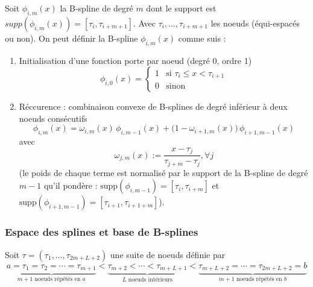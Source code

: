 \documentclass[11pt,a4paper,oneside]{report}
\begin{document}
	
	Soit $\phi_{i,m}(x)$ la B-spline de degré $m$ dont le support est $supp(\phi_{i,m}(x)) = [\tau_i, \tau_{i+m+1}]$. Avec $\tau_i, \ldots, \tau_{i+m+1}$ les noeuds (équi-espacés ou non). On peut définir la B-spline $\phi_{i,m}(x)$ comme suis \cite{deBoor} : 
	\begin{enumerate}
		\item Initialisation d'une fonction porte par noeud (degré 0, ordre 1)
		\begin{equation}
			\phi_{i,0}(x) = \begin{cases}
				1 & \text{si } \tau_i \leq x < \tau_{i+1} \\
				0 & \text{sinon}
			\end{cases}
		\end{equation}
		
		\item Réccurence : combinaison convexe de B-splines de degré inférieur à deux noeuds consécutifs
		\begin{equation}
			\phi_{i, m}(x) = \omega_{i,m}(x)\, \phi_{i, m-1}(x) + \big(1 - \omega_{i+1,m}(x)\big)\, \phi_{i+1, m-1}(x)
		\end{equation}
		avec
		\begin{equation}
			\omega_{j,m}(x) := \frac{x - \tau_j}{\tau_{j+m}- \tau_j}, \forall j
		\end{equation}
		(le poids de chaque terme est normalisé par le support de la B-spline de degré $m-1$ qu'il pondère : $\text{supp}(\phi_{i,m-1}) = [\tau_i, \tau_{i+m}]$ et $\text{supp}(\phi_{i+1,m-1}) = [\tau_{i+1}, \tau_{i+1+m}]$).
	\end{enumerate}
	
	
	\subsubsection{Espace des splines et base de B-splines}
	Soit $\tau = (\tau_1,\ldots,\tau_{2m+L+2})$ une suite de noeuds définie par
	\begin{equation} \underbrace{a = \tau_1 = \tau_2 = \cdots = \tau_{m+1}}_{m+1 \text{ noeuds répétés en } a} < \underbrace{\tau_{m+2} < \cdots < \tau_{m+L+1}}_{L \text{ noeuds intérieurs}} < \underbrace{\tau_{m+L+2} = \cdots = \tau_{2m+L+2}=b}_{m+1 \text{ noeuds répétés en } b} \end{equation}
	
\end{document}
